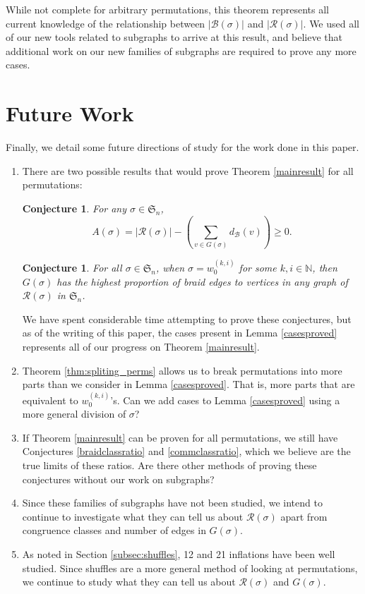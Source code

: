 \documentclass[11pt,reqno]{amsart}
\newtheorem{conjecture}[theorem]{Conjecture}
\theoremstyle{definition}
\theoremstyle{notation}
\newcommand{\calR}{\mathcal{R}}
\newcommand{\calB}{\mathcal{B}}
\newcommand{\Sym}{\mathfrak{S}}
\newcommand{\N}{\mathbb{N}}
\begin{document}
While not complete for arbitrary permutations, this theorem represents all current knowledge of the relationship between $|\calB(\sigma)|$ and $|\calR(\sigma)|$. We used all of our new tools related to subgraphs to arrive at this result, and believe that additional work on our new families of subgraphs are required to prove any more cases.



\section{Future Work}\label{sec:future}%
Finally, we detail some future directions of study for the work done in this paper.

\begin{enumerate}
\item There are two possible results that would prove Theorem \ref{mainresult} for all permutations:

\begin{conjecture}\label{path1}
    For any $\sigma \in \Sym_n$, \[
    A(\sigma)= |\calR(\sigma)|-\left (\sum_{v\in G(\sigma)}d_\calB(v) \right ) \geq 0.
    \]
\end{conjecture}

\begin{conjecture}\label{path2}
    For all $\sigma \in \Sym_n$, when $\sigma = w_0^{(k,i)}$ for some $k,i\in \N$, then $G(\sigma)$ has the highest proportion of braid edges to vertices in any graph of $\calR(\sigma)$ in $\Sym_n$.
\end{conjecture}

 We have spent considerable time attempting to prove these conjectures, but as of the writing of this paper, the cases present in Lemma \ref{casesproved} represents all of our progress on Theorem \ref{mainresult}. 

 \item Theorem \ref{thm:spliting_perms} allows us to break permutations into more parts than we consider in Lemma \ref{casesproved}. That is, more parts that are equivalent to $w_0^{(k,i)}$'s. Can we add cases to Lemma \ref{casesproved} using a more general division of $\sigma$?

\item If Theorem \ref{mainresult} can be proven for all permutations, we still have Conjectures \ref{braidclassratio} and \ref{commclassratio}, which we believe are the true limits of these ratios. Are there other methods of proving these conjectures without our work on subgraphs?

\item Since these families of subgraphs have not been studied, we intend to continue to investigate what they can tell us about $\calR(\sigma)$ apart from congruence classes and number of edges in $G(\sigma)$.


\item As noted in Section \ref{subsec:shuffles}, 12 and 21 inflations have been well studied. Since shuffles are a more general method of looking at permutations, we continue to study what they can tell us about $\calR(\sigma)$ and $G(\sigma)$.

\end{enumerate}
\end{document}
